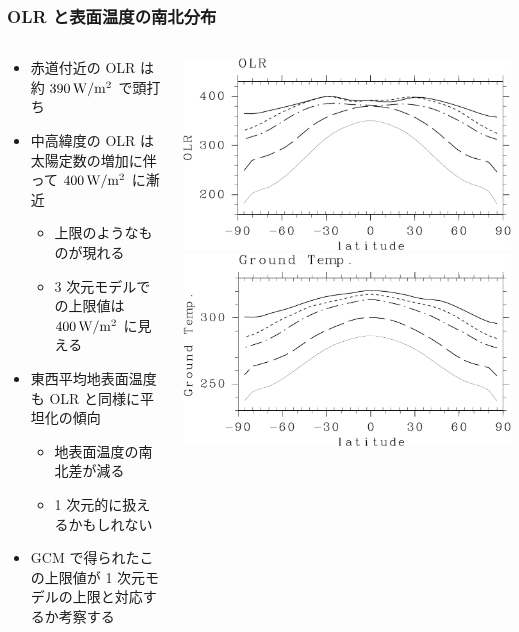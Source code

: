 \documentclass[aspectratio=149,9pt,fleqn]{beamer}
\begin{document}
\begin{frame}
	\frametitle{OLR と表面温度の南北分布}
	\begin{columns}[T,onlytextwidth]
		\begin{column}{.55\textwidth}
			\begin{itemize}
				\item 赤道付近の OLR は約 \(390\hmu{W/m^2}\) で頭打ち
				\item 中高緯度の OLR は太陽定数の増加に伴って \(400\hmu{W/m^2}\) に漸近
					\begin{itemize}
						\item 上限のようなものが現れる
						\item 3 次元モデルでの上限値は \(400\hmu{W/m^2}\) に見える
					\end{itemize}
				\item 東西平均地表面温度も OLR と同様に平坦化の傾向
					\begin{itemize}
						\item 地表面温度の南北差が減る
						\item 1 次元的に扱えるかもしれない
					\end{itemize}
				\item GCM で得られたこの上限値が 1 次元モデルの上限と対応するか考察する
			\end{itemize}
		\end{column}
		\begin{column}{.4\textwidth}
			\centering
			\includegraphics[width=\textwidth]{./fig/OLR-meris.kps-crop.pdf}\\
			\includegraphics[width=\textwidth]{./fig/Tg-meris.kps-crop.pdf}\\

\end{column}
\end{columns}
\end{frame}
\end{document}
